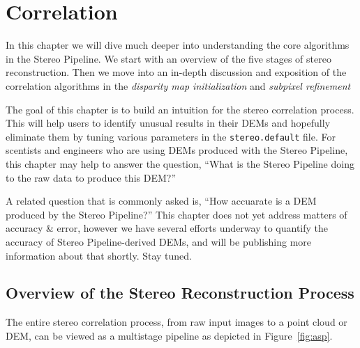 \chapter{Correlation}
\label{ch:correlation}

In this chapter we will dive much deeper into understanding the core
algorithms in the Stereo Pipeline.  We start with an overview of the
five stages of stereo reconstruction.  Then we move into an in-depth
discussion and exposition of the correlation algorithms in the {\em
  disparity map initialization} and {\em subpixel refinement}

The goal of this chapter is to build an intuition for the stereo
correlation process.  This will help users to identify unusual results
in their DEMs and hopefully eliminate them by tuning various
parameters in the {\tt stereo.default} file.  For scentists and
engineers who are using DEMs produced with the Stereo Pipeline, this
chapter may help to answer the question, ``What is the Stereo Pipeline
doing to the raw data to produce this DEM?''  

A related question that is commonly asked is, ``How accuarate is a DEM
produced by the Stereo Pipeline?''  This chapter does not yet address
matters of accuracy \& error, however we have several efforts underway
to quantify the accuracy of Stereo Pipeline-derived DEMs, and will be
publishing more information about that shortly.  Stay tuned.

\section{Overview of the Stereo Reconstruction Process}

The entire stereo correlation process, from raw input images to a
point cloud or DEM, can be viewed as a multistage pipeline as depicted
in Figure~\ref{fig:asp}.

